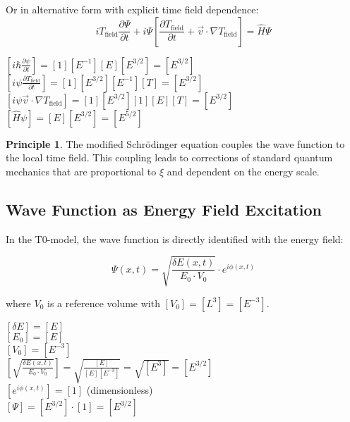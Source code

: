 \documentclass[12pt,a4paper]{article}
\newcommand{\tfield}{T_{\text{field}}}
\newcommand{\dfield}{\delta E}
\theoremstyle{definition}
\newtheorem{prinzip}{Principle}
\begin{document}
	Or in alternative form with explicit time field dependence:
	\begin{equation}
		\boxed{i \tfield \frac{\partial\Psi}{\partial t} + i\Psi\left[\frac{\partial \tfield}{\partial t} + \vec{v} \cdot \nabla \tfield\right] = \hat{H}\Psi}
	\end{equation}
	
	\begin{einheitencheck}
		$[i \hbar \frac{\partial\psi}{\partial t}] = [1][E^{-1}][E][E^{3/2}] = [E^{3/2}]$\\
		$[i\psi\frac{\partial \tfield}{\partial t}] = [1][E^{3/2}][E^{-1}][T] = [E^{3/2}]$\\
		$[i\psi\vec{v} \cdot \nabla \tfield] = [1][E^{3/2}][1][E][T] = [E^{3/2}]$\\
		$[\hat{H}\psi] = [E][E^{3/2}] = [E^{5/2}]$ \checkmark
	\end{einheitencheck}
	
	\begin{prinzip}
		The modified Schrödinger equation couples the wave function to the local time field. This coupling leads to corrections of standard quantum mechanics that are proportional to $\xi$ and dependent on the energy scale.
	\end{prinzip}
	
	\subsection{Wave Function as Energy Field Excitation}
	
	In the T0-model, the wave function is directly identified with the energy field:
	
	\begin{equation}
		\Psi(x,t) = \sqrt{\frac{\dfield(x,t)}{E_0 \cdot V_0}} \cdot e^{i\phi(x,t)}
	\end{equation}
	
	where $V_0$ is a reference volume with $[V_0] = [L^3] = [E^{-3}]$.
	
	\begin{einheitencheck}
		$[\dfield] = [E]$\\
		$[E_0] = [E]$\\
		$[V_0] = [E^{-3}]$\\
		$[\sqrt{\frac{\dfield(x,t)}{E_0 \cdot V_0}}] = \sqrt{\frac{[E]}{[E][E^{-3}]}} = \sqrt{[E^3]} = [E^{3/2}]$\\
		$[e^{i\phi(x,t)}] = [1]$ (dimensionless)\\
		$[\Psi] = [E^{3/2}] \cdot [1] = [E^{3/2}]$ \checkmark
	\end{einheitencheck}
	
\end{document}
